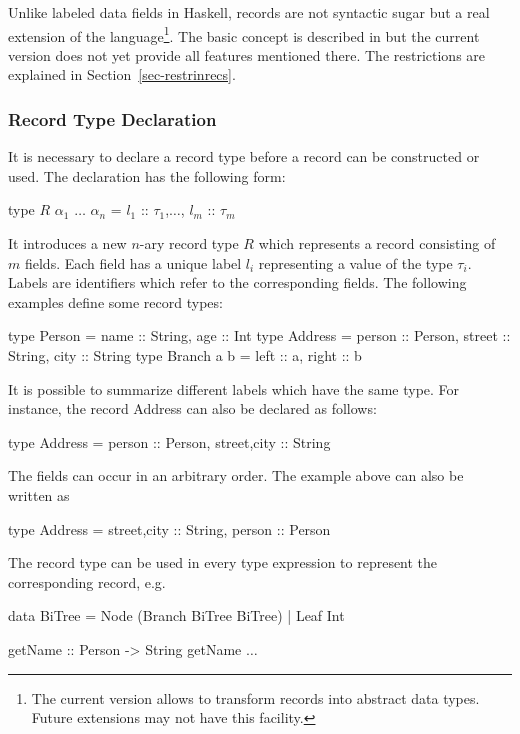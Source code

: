\documentclass[11pt,fleqn]{article}
\renewcommand{\tt}{\usefont{OT1}{cmtt}{m}{n}\selectfont}
\newcommand{\codefont}{\tt}
\newcommand{\code}[1]{\mbox{\codefont #1}}
\begin{document}
Unlike labeled data fields in Haskell, records are 
not syntactic sugar but a real extension of the
language\footnote{The current version allows to transform records
  into abstract data types. Future extensions may not have
  this facility.}.
The basic concept is described in \cite{Leijen05} but the current
version does not yet provide all features mentioned there. 
The restrictions are explained in Section~\ref{sec-restrinrecs}.
 
\subsubsection{Record Type Declaration}
\label{sec-recordtypedecl}

It is necessary to declare a record type before a record
can be constructed or used. The declaration has the following form:
\begin{curry}
type $R$ $\alpha_1$ $\ldots$ $\alpha_n$ = { $l_1$ :: $\tau_1$,$\ldots$, $l_m$ :: $\tau_m$ }
\end{curry}
It introduces a new $n$-ary record type $R$ which represents a
record consisting of $m$ fields. Each field has a unique label $l_i$ 
representing a value of the type $\tau_i$. Labels
are identifiers which refer to the corresponding
fields. The following examples define some record types:
\begin{curry}
type Person = {name :: String, age :: Int}
type Address = {person :: Person, street :: String, city :: String}
type Branch a b = {left :: a, right :: b}
\end{curry}
It is possible to summarize different labels which have the same
type. For instance, the record \code{Address} can also be declared as follows:
\begin{curry}
type Address = {person :: Person, street,city :: String}
\end{curry}
The fields can occur in an arbitrary order. The example above
can also be written as
\begin{curry}
type Address = {street,city :: String, person :: Person}
\end{curry}
The record type can be used in every type expression to represent
the corresponding record, e.g.
\begin{curry}
data BiTree = Node (Branch BiTree BiTree) | Leaf Int
\end{curry}
\begin{curry}
getName :: Person -> String
getName $\ldots$
\end{curry}
\end{document}
